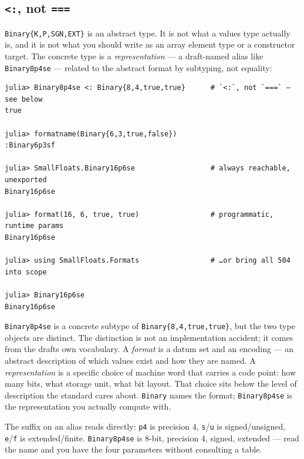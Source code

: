 \subsection{\texttt{<:}, not \texttt{===}}



\label{3394570003399755675}{}


\texttt{Binary\{K,P,SGN,EXT\}} is an abstract type. It is not what a value{\textquotesingle}s type actually is, and it is not what you should write as an array element type or a constructor target. The concrete type is a \emph{representation} — a draft-named alias like \texttt{Binary8p4se} — related to the abstract format by subtyping, not equality:




\nopagebreak[4]
\begin{verbatim}
julia> Binary8p4se <: Binary{8,4,true,true}      # `<:`, not `===` — see below
true

julia> formatname(Binary{6,3,true,false})
:Binary6p3sf

julia> SmallFloats.Binary16p6se                  # always reachable, unexported
Binary16p6se

julia> format(16, 6, true, true)                 # programmatic, runtime params
Binary16p6se

julia> using SmallFloats.Formats                 # …or bring all 504 into scope

julia> Binary16p6se
Binary16p6se
\end{verbatim}



\texttt{Binary8p4se} is a concrete subtype of \texttt{Binary\{8,4,true,true\}}, but the two type objects are distinct. The distinction is not an implementation accident; it comes from the draft{\textquotesingle}s own vocabulary. A \emph{format} is a datum set and an encoding — an abstract description of which values exist and how they are named. A \emph{representation} is a specific choice of machine word that carries a code point: how many bits, what storage unit, what bit layout. That choice sits below the level of description the standard cares about. \texttt{Binary} names the format; \texttt{Binary8p4se} is the representation you actually compute with.



The suffix on an alias reads directly: \texttt{p4} is precision 4, \texttt{s}/\allowbreak\texttt{u} is signed/unsigned, \texttt{e}/\allowbreak\texttt{f} is extended/finite. \texttt{Binary8p4se} is 8-bit, precision 4, signed, extended — read the name and you have the four parameters without consulting a table.



